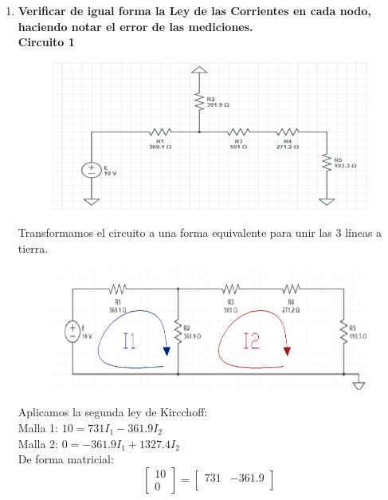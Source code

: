 \documentclass[a4paper,12pt]{report}
\begin{document}
\begin{enumerate}
\begin{figure}[H]
\begin{center}
\end{center}
\end{figure}
\item \textbf{Verificar de igual forma la Ley de las Corrientes en cada nodo, haciendo notar el error de las mediciones.}\\
\textbf{Circuito 1}\\
\begin{figure}[H]
\begin{center}
\includegraphics[scale=0.52]{sergodcirc1,1.png}
\end{center}
\end{figure}
Transformamos el circuito a una forma equivalente para unir las 3 líneas a tierra.
\begin{figure}[H]
\begin{center}
\includegraphics[scale=0.6]{sergodcirc1,2.png}
\end{center}
\end{figure}
Aplicamos la segunda ley de Kircchoff:\\
Malla 1: $10 = 731I_{1} - 361.9I_{2}$\\
Malla 2: $0 = -361.9I_{1} + 1327.4I_{2}$\\
De forma matricial:
$$
\begin{bmatrix}
10\\
0
\end{bmatrix}
 = 
\begin{bmatrix}
731 & -361.9\\

\end{bmatrix}$$
\end{enumerate}
\end{document}
